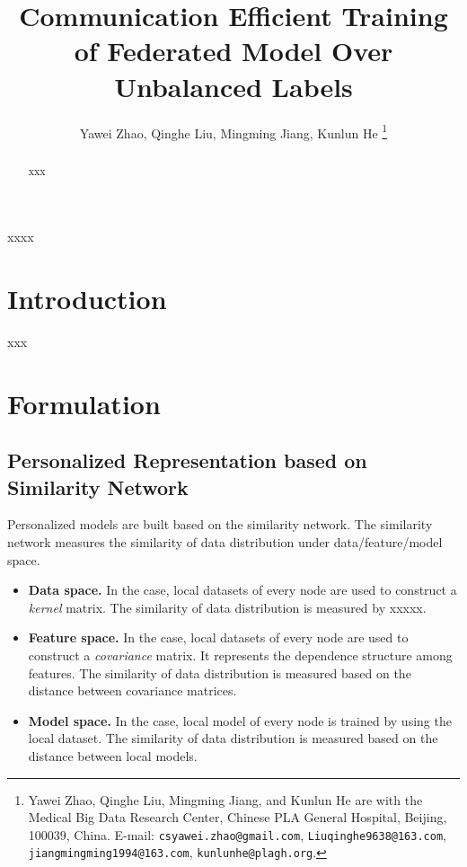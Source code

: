 \documentclass[journal]{IEEEtran}
\begin{document}
\title{Communication Efficient Training of Federated Model Over Unbalanced Labels}


\author{Yawei Zhao, Qinghe Liu, Mingming Jiang, Kunlun He
\thanks{Yawei Zhao, Qinghe Liu, Mingming Jiang, and Kunlun He are with the Medical Big Data Research Center, Chinese PLA General Hospital, Beijing, 100039, China. E-mail: \texttt{csyawei.zhao@gmail.com},  \texttt{Liuqinghe9638@163.com}, \texttt{jiangmingming1994@163.com}, \texttt{kunlunhe@plagh.org}.
}
}



\maketitle

\begin{abstract}
xxx

\end{abstract}

\begin{IEEEkeywords}
xxxx
\end{IEEEkeywords}


\IEEEpeerreviewmaketitle


\section{Introduction}
\label{sect_introduction}
xxx




\section{Formulation}

\subsection{Personalized Representation based on Similarity Network}

Personalized models are built based on the similarity network. The similarity network measures the similarity of data distribution under data/feature/model space.  
\begin{itemize}
\item \textbf{Data space.} In the case, local datasets of every node are used to construct a \textit{kernel} matrix. The similarity of data distribution is measured by xxxxx.
\item \textbf{Feature space.} In the case, local datasets of every node are used to construct a \textit{covariance} matrix. It represents the dependence structure among features. The similarity of data distribution is measured based on the distance between covariance matrices.
\item \textbf{Model space.} In the case, local model of every node is trained by using the local dataset. The similarity of data distribution is measured based on the distance between local models.
\end{itemize}
\end{document}
